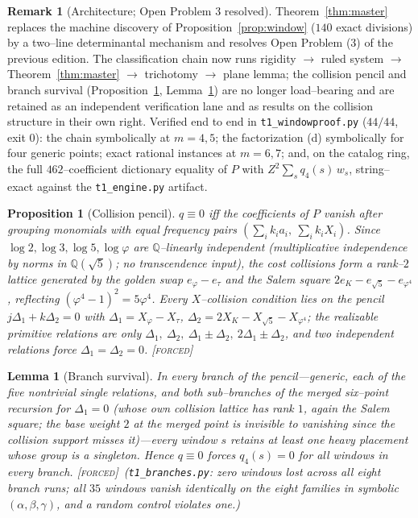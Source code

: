 \documentclass[11pt]{article}
\newtheorem{proposition}[theorem]{Proposition}
\newtheorem{lemma}[theorem]{Lemma}
\theoremstyle{definition}
\newtheorem{remark}[theorem]{Remark}
\newcommand{\ph}{\varphi}
\newcommand{\Q}{\mathbb{Q}}
\newcommand{\forcedtag}{{\scshape [forced]}}
\begin{document}
\begin{remark}[Architecture; Open Problem 3 resolved]\label{rem:master}
Theorem~\ref{thm:master} replaces the machine discovery of Proposition~\ref{prop:window} ($140$
exact divisions) by a two--line determinantal mechanism and resolves Open Problem (3) of the
previous edition. The classification chain now runs rigidity $\to$ ruled system $\to$
Theorem~\ref{thm:master} $\to$ trichotomy $\to$ plane lemma; the collision pencil and branch
survival (Proposition~\ref{prop:pencil}, Lemma~\ref{lem:survival}) are no longer load--bearing and
are retained as an independent verification lane and as results on the collision structure in their
own right. Verified end to end in \texttt{t1\_windowproof.py} ($44/44$, exit $0$): the chain
symbolically at $m=4,5$; the factorization (d) symbolically for four generic points; exact rational
instances at $m=6,7$; and, on the catalog ring, the full $462$--coefficient dictionary equality of
$P$ with $Z^2\sum_sq_4(s)\,w_s$, string--exact against the \texttt{t1\_engine.py} artifact.
\end{remark}

\begin{proposition}[Collision pencil]\label{prop:pencil}
$q\equiv0$ iff the coefficients of $P$ vanish after grouping monomials with equal frequency pairs
$(\sum_ik_ia_i,\ \sum_ik_iX_i)$. Since $\log2,\log3,\log5,\log\ph$ are $\Q$--linearly independent
(multiplicative independence by norms in $\Q(\sqrt5)$; no transcendence input), the cost collisions
form a rank--$2$ lattice generated by the golden swap $e_\ph-e_\tau$ and the Salem square
$2e_K-e_{\sqrt5}-e_{\ph^4}$, reflecting $(\ph^4-1)^2=5\ph^4$. Every $X$--collision condition lies on
the pencil $j\Delta_1+k\Delta_2=0$ with $\Delta_1=X_\ph-X_\tau$, $\Delta_2=2X_K-X_{\sqrt5}-X_{\ph^4}$;
the realizable primitive relations are only $\Delta_1,\ \Delta_2,\ \Delta_1\pm\Delta_2,\
2\Delta_1\pm\Delta_2$, and two independent relations force $\Delta_1=\Delta_2=0$. \forcedtag
\end{proposition}

\begin{lemma}[Branch survival]\label{lem:survival}
In every branch of the pencil---generic, each of the five nontrivial single relations, and both
sub--branches of the merged six--point recursion for $\Delta_1=0$ (whose own collision lattice has
rank $1$, again the Salem square; the base weight $2$ at the merged point is invisible to vanishing
since the collision support misses it)---every window $s$ retains at least one heavy placement whose
group is a singleton. Hence $q\equiv0$ forces $q_4(s)=0$ for \emph{all} windows in \emph{every}
branch. \forcedtag\ (\texttt{t1\_branches.py}: zero windows lost across all eight branch runs; all
$35$ windows vanish identically on the eight families in symbolic $(\alpha,\beta,\gamma)$, and a
random control violates one.)
\end{lemma}
\end{document}

